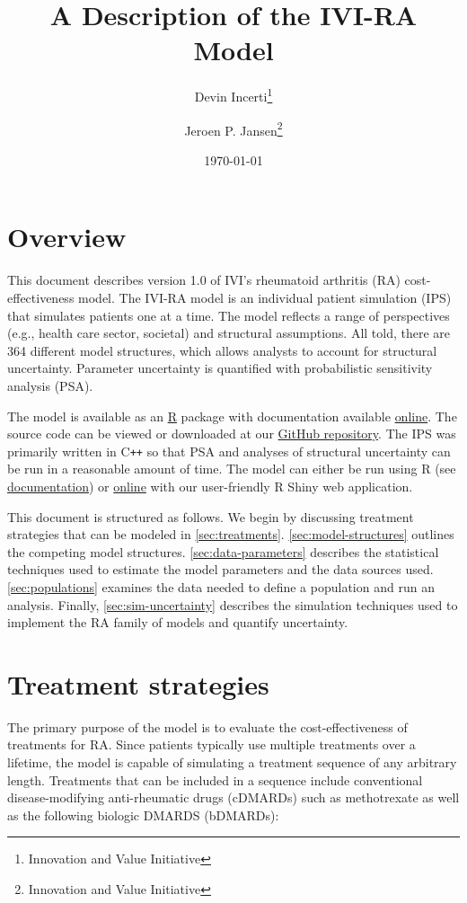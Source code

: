 \documentclass[11pt,final,fleqn]{article}\usepackage[]{graphicx}\usepackage[]{color}
\title{A Description of the IVI-RA Model}
\author{Devin Incerti\footnote{Innovation and Value Initiative} \and Jeroen P. Jansen\footnote{Innovation and Value Initiative}}
\date{\today}
\theoremstyle{plain}
\newcommand\CPP{{C\texttt{++}}}
\newcommand\R{{\textsf{R}}}
\begin{document}
\maketitle

\begingroup
 \hypersetup{linkcolor=black} \tableofcontents
 \listoffigures
 \listoftables
\endgroup



\section{Overview}\label{overview}

This document describes version 1.0 of IVI's rheumatoid arthritis (RA) cost-effectiveness model. The IVI-RA model is an individual patient simulation (IPS) that simulates patients one at a time. The model reflects a range of perspectives (e.g., health care sector, societal) and structural assumptions. All told, there are 364 different model structures, which allows analysts to account for structural uncertainty. Parameter uncertainty is quantified with probabilistic sensitivity analysis (PSA).

The model is available as an \href{https://cran.r-project.org/}{\R{}} package with documentation available \href{https://innovationvalueinitiative.github.io/IVI-RA/index.html}{online}. The source code can be viewed or downloaded at our \href{https://github.com/InnovationValueInitiative/IVI-RA}{GitHub repository}. The IPS was primarily written in \CPP{} so that PSA and analyses of structural uncertainty can be run in a reasonable amount of time. The model can either be run using \R{} (see \href{https://innovationvalueinitiative.github.io/IVI-RA/index.html}{documentation}) or \href{http://www.shinyapps.io/}{online} with our user-friendly R Shiny web application. 

This document is structured as follows. We begin by discussing treatment strategies that can be modeled in \autoref{sec:treatments}. \autoref{sec:model-structures} outlines the competing model structures. \autoref{sec:data-parameters} describes the statistical techniques used to estimate the model parameters and the data sources used. \autoref{sec:populations} examines the data needed to define a population and run an analysis. Finally, \autoref{sec:sim-uncertainty} describes the simulation techniques used to implement the RA family of models and quantify uncertainty.

\section{Treatment strategies}\label{sec:treatments}
The primary purpose of the model is to evaluate the cost-effectiveness of treatments for RA. Since patients typically use multiple treatments over a lifetime, the model is capable of simulating a treatment sequence of any arbitrary length. Treatments that can be included in a sequence include conventional disease-modifying anti-rheumatic drugs (cDMARDs) such as methotrexate as well as the following biologic DMARDS (bDMARDs):
\end{document}
